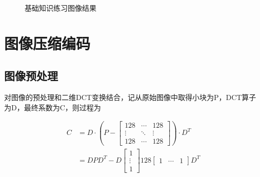 \documentclass[10pt, a4paper]{article}
\begin{document}
\begin{figure}[ht!]
    \centering
    \quad
    \caption{基础知识练习图像结果}
    \label{fig:exp1}
\end{figure}

\section{图像压缩编码}

\subsection{图像预处理}

对图像的预处理和二维DCT变换结合，记从原始图像中取得小块为P，DCT算子为D，最终系数为C，则过程为

\begin{align*}
    C & = D \cdot (P -
    \begin{bmatrix}
        128    & \cdots & 128    \\
        \vdots & \ddots & \vdots \\
        128    & \cdots & 128
    \end{bmatrix}
    ) \cdot D^T        \\
      & =DPD^T - D
    \begin{bmatrix}
        1      \\
        \vdots \\
        1
    \end{bmatrix}
    128
    \begin{bmatrix}
        1 & \cdots & 1
    \end{bmatrix}
    D^T
\end{align*}
\end{document}
